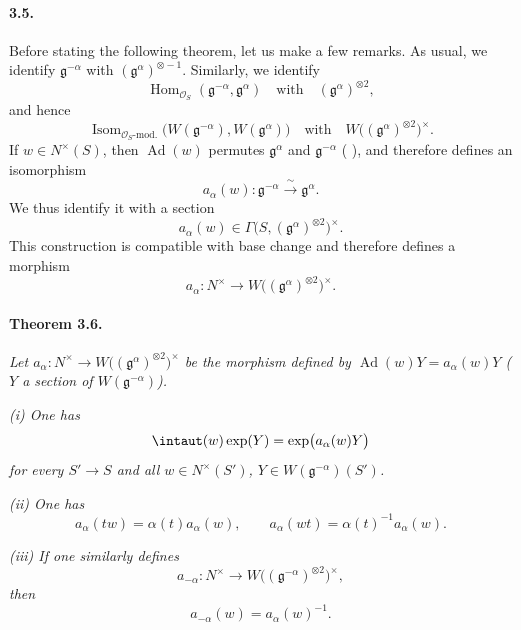 
\paragraph{\textbf{3.5.}}
Before stating the following theorem, let us make a few remarks.  As
usual, we identify \(\mathfrak g^{-\alpha}\) with
\((\mathfrak g^\alpha)^{\otimes-1}\).  Similarly, we identify
\[
  \operatorname{Hom}_{\mathscr O_S}
    (\mathfrak g^{-\alpha},\mathfrak g^\alpha)
  \quad\text{with}\quad
  (\mathfrak g^\alpha)^{\otimes2},
\]
and hence
\[
  \operatorname{Isom}_{\mathscr O_S\text{-mod.}}
    \bigl(W(\mathfrak g^{-\alpha}),W(\mathfrak g^\alpha)\bigr)
  \quad\text{with}\quad
  W\bigl((\mathfrak g^\alpha)^{\otimes2}\bigr)^\times.
\]
If \(w\in N^\times(S)\), then
\(\operatorname{Ad}(w)\) permutes
\(\mathfrak g^\alpha\) and \(\mathfrak g^{-\alpha}\)
\textup{( \textup{})}, and therefore defines an isomorphism
\[
  a_\alpha(w)\colon
  \mathfrak g^{-\alpha}\xrightarrow{\ \sim\ }\mathfrak g^\alpha.
\]
We thus identify it with a section
\[
  a_\alpha(w)\in
  \Gamma\bigl(S,(\mathfrak g^\alpha)^{\otimes2}\bigr)^\times.
\]
This construction is compatible with base change and therefore
defines a morphism
\[
  a_\alpha\colon
  N^\times\longrightarrow
  W\bigl((\mathfrak g^\alpha)^{\otimes2}\bigr)^\times.
\]

\paragraph{\textbf{Theorem 3.6.}}
\emph{Let
\(a_\alpha\colon N^\times\to W\bigl((\mathfrak g^\alpha)^{\otimes2}\bigr)^\times\)
be the morphism defined by \(\operatorname{Ad}(w)Y=a_\alpha(w)Y\)
\textup{(}\(Y\) a section of \(W(\mathfrak g^{-\alpha})\)\textup{)}.}

\smallskip
\noindent\emph{\textup{(i)} One has}
\[
  \intaut(w)\exp(Y)=\exp\bigl(a_\alpha(w)Y\bigr)
\]
\emph{for every \(S'\to S\) and all \(w\in N^\times(S')\),
\(Y\in W(\mathfrak g^{-\alpha})(S')\).}

\smallskip
\noindent\emph{\textup{(ii)} One has}
\[
  a_\alpha(tw)=\alpha(t)a_\alpha(w),
  \qquad
  a_\alpha(wt)=\alpha(t)^{-1}a_\alpha(w).
\]

\smallskip
\noindent\emph{\textup{(iii)} If one similarly defines}
\[
  a_{-\alpha}\colon
  N^\times\longrightarrow
  W\bigl((\mathfrak g^{-\alpha})^{\otimes2}\bigr)^\times,
\]
\emph{then}
\[
  a_{-\alpha}(w)=a_\alpha(w)^{-1}.
\]

